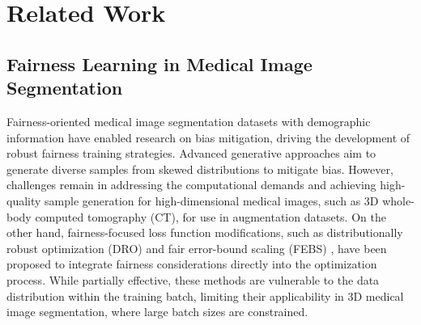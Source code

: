 \section{Related Work}
\subsection{Fairness Learning in Medical Image Segmentation}
Fairness-oriented medical image segmentation datasets with demographic information \cite{tschandl2018ham10000, tianfairseg} have enabled research on bias mitigation, driving the development of robust fairness training strategies. Advanced generative approaches \cite{li2024fairdiff, ktena2024generative} aim to generate diverse samples from skewed distributions to mitigate bias. However, challenges remain in addressing the computational demands and achieving high-quality sample generation for high-dimensional medical images, such as 3D whole-body computed tomography (CT), for use in augmentation datasets. On the other hand, fairness-focused loss function modifications, such as distributionally robust optimization (DRO) \cite{sagawa2019distributionally} and fair error-bound scaling (FEBS) \cite{tianfairseg}, have been proposed to integrate fairness considerations directly into the optimization process. While partially effective, these methods are vulnerable to the data distribution within the training batch, limiting their applicability in 3D medical image segmentation, where large batch sizes are constrained. 
 
